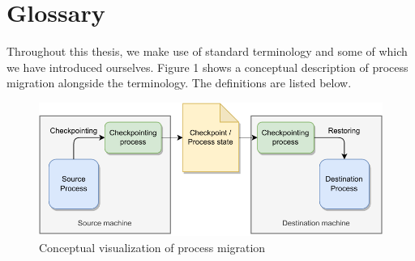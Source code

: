 \documentclass[a4paper, 11pt, english]{report}
\begin{document}
\tableofcontents

\chapter*{Glossary}
\label{ch:glossary}
Throughout this thesis, we make use of standard terminology and some of which we have introduced ourselves.
Figure 1 shows a conceptual description of process migration alongside the terminology. The definitions are listed below.

\begin{figure}[h]
\label{fig:process-migration}
\centerline{\includegraphics{images/process migration terminology.drawio-1.drawio-3.pdf}}
%                
%    

\caption{Conceptual visualization of process migration}
\end{figure}
\end{document}
